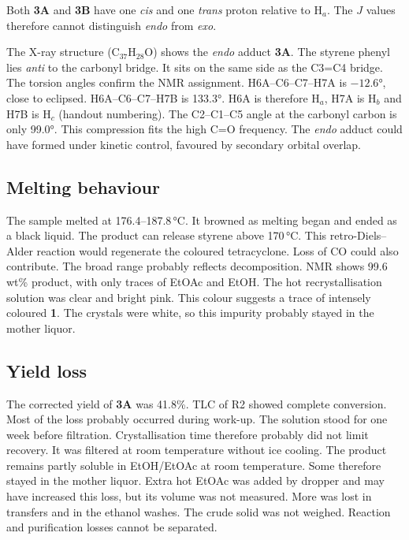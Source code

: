 \documentclass[11pt,a4paper]{article}
\begin{document}
Both \textbf{3A} and \textbf{3B} have one \emph{cis} and one \emph{trans}  proton relative to H$_a$. The $J$ values therefore cannot distinguish \emph{endo} from \emph{exo}.

The X-ray structure (C$_{37}$H$_{28}$O) shows the \emph{endo} adduct \textbf{3A}.\cite{XRD,Hoang2015} The styrene phenyl lies \emph{anti} to the carbonyl bridge. It sits on the same side as the C3=C4 bridge. The torsion angles confirm the NMR assignment. H6A--C6--C7--H7A is $-12.6$\si{\degree}, close to eclipsed. H6A--C6--C7--H7B is 133.3\si{\degree}. H6A is therefore H$_a$, H7A is H$_b$ and H7B is H$_c$ (handout numbering). The C2--C1--C5 angle at the carbonyl carbon is only 99.0\si{\degree}. This compression fits the high C=O frequency. The \emph{endo} adduct could have formed under kinetic control, favoured by secondary orbital overlap.\cite{L2}

\subsection{Melting behaviour}
The sample melted at 176.4--187.8\,\si{\celsius}. It browned as melting began and ended as a black liquid. The product can release styrene above 170\,\si{\celsius}.\cite{Manual2026} This retro-Diels--Alder reaction would regenerate the coloured tetracyclone. Loss of CO could also contribute. The broad range probably reflects decomposition. NMR shows 99.6 wt\% product, with only traces of EtOAc and EtOH. The hot recrystallisation solution was clear and bright pink. This colour suggests a trace of intensely coloured \textbf{1}. The crystals were white, so this impurity probably stayed in the mother liquor.

\subsection{Yield loss}
The corrected yield of \textbf{3A} was 41.8\%. TLC of R2 showed complete conversion. Most of the loss probably occurred during work-up. The solution stood for one week before filtration. Crystallisation time therefore probably did not limit recovery. It was filtered at room temperature without ice cooling. The product remains partly soluble in EtOH/EtOAc at room temperature. Some therefore stayed in the mother liquor. Extra hot EtOAc was added by dropper and may have increased this loss, but its volume was not measured. More was lost in transfers and in the ethanol washes. The crude solid was not weighed. Reaction and purification losses cannot be separated.
\end{document}
